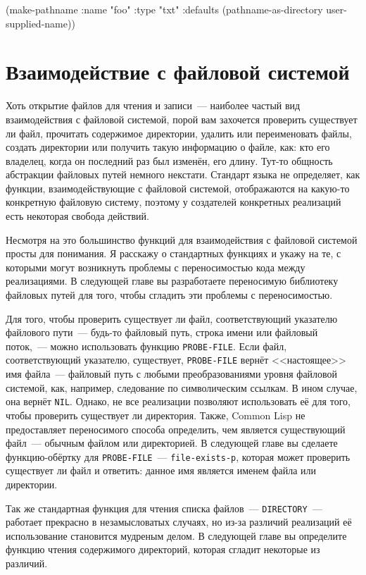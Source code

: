 \begin{myverb}
(make-pathname 
  :name "foo" :type "txt" :defaults (pathname-as-directory user-supplied-name))
\end{myverb}

\section{Взаимодействие с файловой системой}

Хоть открытие файлов для чтения и записи~--- наиболее частый вид взаимодействия с файловой
системой, порой вам захочется проверить существует ли файл, прочитать содержимое
директории, удалить или переименовать файлы, создать директории или получить такую
информацию о файле, как: кто его владелец, когда он последний раз был изменён, его
длину. Тут-то общность абстракции файловых путей немного некстати. Стандарт языка не
определяет, как функции, взаимодействующие с файловой системой, отображаются на какую-то
конкретную файловую систему, поэтому у создателей конкретных реализаций есть некоторая
свобода действий.

Несмотря на это большинство функций для взаимодействия с файловой системой просты для
понимания. Я расскажу о стандартных функциях и укажу на те, с которыми могут возникнуть
проблемы с переносимостью кода между реализациями. В следующей главе вы разработаете
переносимую библиотеку файловых путей для того, чтобы сгладить эти проблемы с
переносимостью.

Для того, чтобы проверить существует ли файл, соответствующий указателю файлового пути~---
будь-то файловый путь, строка имени или файловый поток,~--- можно использовать функцию
\lstinline{PROBE-FILE}. Если файл, соответствующий указателю, существует, \lstinline{PROBE-FILE}
вернёт <<настоящее>> имя файла~--- файловый путь с любыми преобразованиями уровня файловой
системой, как, например, следование по символическим ссылкам. В ином случае, она вернёт
\lstinline{NIL}. Однако, не все реализации позволяют использовать её для того, чтобы проверить
существует ли директория. Также, Common Lisp не предоставляет переносимого способа
определить, чем является существующий файл~--- обычным файлом или директорией. В следующей
главе вы сделаете функцию-обёртку для \lstinline{PROBE-FILE}~--- \lstinline{file-exists-p}, которая
может проверить существует ли файл и ответить: данное имя является именем файла или
директории.

Так же стандартная функция для чтения списка файлов~--- \lstinline{DIRECTORY}~--- работает
прекрасно в незамысловатых случаях, но из-за различий реализаций её использование
становится мудреным делом. В следующей главе вы определите функцию чтения содержимого
директорий, которая сгладит некоторые из различий.

